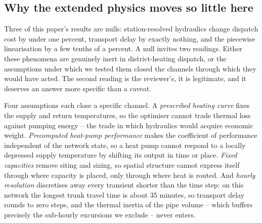 
\subsection{Why the extended physics moves so little here}
\label{subsec:whynull}

Three of this paper's results are nulls: station-resolved hydraulics change dispatch cost
by under one percent, transport delay by exactly nothing, and the piecewise linearisation
by a few tenths of a percent. A null invites two readings. Either these phenomena are
genuinely inert in district-heating dispatch, or the assumptions under which we tested them
closed the channels through which they would have acted. The second reading is the
reviewer's, it is legitimate, and it deserves an answer more specific than a caveat.

Four assumptions each close a specific channel. A \emph{prescribed heating curve} fixes the
supply and return temperatures, so the optimiser cannot trade thermal loss against pumping
energy -- the trade in which hydraulics would acquire economic weight. \emph{Precomputed
heat-pump performance} makes the coefficient of performance independent of the network
state, so a heat pump cannot respond to a locally depressed supply temperature by shifting
its output in time or place. \emph{Fixed capacities} remove siting and sizing, so spatial
structure cannot express itself through where capacity is placed, only through where heat
is routed. And \emph{hourly resolution} discretises away every transient shorter than the
time step: on this network the longest trunk travel time is about 35 minutes, so transport
delay rounds to zero steps, and the thermal inertia of the pipe volume -- which buffers
precisely the sub-hourly excursions we exclude -- never enters.

